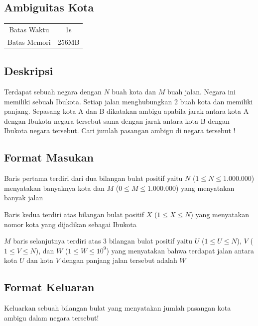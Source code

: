 \documentclass{article}
\begin{document}
\begin{center}

    
    \section*{Ambiguitas Kota} %

    \begin{tabular}{ | c c | }
        \hline
        Batas Waktu  & 1s \\    %
        Batas Memori & 256MB \\  %
        \hline
    \end{tabular}
\end{center}

\subsection*{Deskripsi}
Terdapat sebuah negara dengan $N$ buah kota dan $M$ buah jalan. Negara ini memiliki sebuah Ibukota. Setiap jalan menghubungkan 2 buah kota dan memiliki panjang. Sepasang kota A dan B dikatakan ambigu apabila jarak antara kota A dengan Ibukota negara tersebut sama dengan jarak antara kota B dengan Ibukota negara tersebut. Cari jumlah pasangan ambigu di negara tersebut !

\subsection*{Format Masukan}
Baris pertama terdiri dari dua bilangan bulat positif yaitu $N$ ($1 \leq N \leq 1.000.000$) menyatakan banyaknya kota dan
$M$ ($0 \leq M \leq 1.000.000$) yang menyatakan banyak jalan

Baris kedua terdiri atas bilangan bulat positif $X$ ($1 \leq X \leq N$) yang menyatakan nomor kota yang dijadikan sebagai Ibukota

$M$ baris selanjutnya terdiri atas 3 bilangan bulat positif yaitu $U$ ($1 \leq U \leq N$), $V$ ($1 \leq V \leq N$), dan $W$ ($1 \leq W \leq 10^9$) yang menyatakan bahwa terdapat jalan antara kota $U$ dan kota $V$ dengan panjang jalan tersebut adalah $W$

\subsection*{Format Keluaran}
Keluarkan sebuah bilangan bulat yang menyatakan jumlah pasangan kota ambigu dalam negara tersebut!
\end{document}
